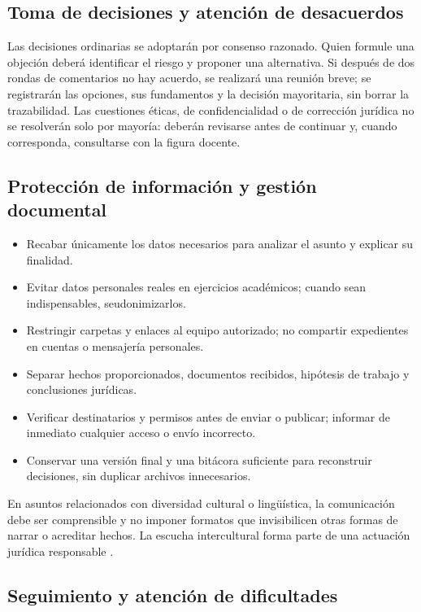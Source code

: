 \documentclass[
  spanish,
  letterpaper, oneside
]{article}
\begin{document}
\subsection{Toma de decisiones y atención de desacuerdos}

Las decisiones ordinarias se adoptarán por consenso razonado. Quien formule una
objeción deberá identificar el riesgo y proponer una alternativa. Si después de dos
rondas de comentarios no hay acuerdo, se realizará una reunión breve; se registrarán
las opciones, sus fundamentos y la decisión mayoritaria, sin borrar la trazabilidad.
Las cuestiones éticas, de confidencialidad o de corrección jurídica no se resolverán
solo por mayoría: deberán revisarse antes de continuar y, cuando corresponda,
consultarse con la figura docente.

\subsection{Protección de información y gestión documental}

\begin{itemize}
  \item Recabar únicamente los datos necesarios para analizar el asunto y explicar su finalidad.
  \item Evitar datos personales reales en ejercicios académicos; cuando sean indispensables, seudonimizarlos.
  \item Restringir carpetas y enlaces al equipo autorizado; no compartir expedientes en cuentas o mensajería personales.
  \item Separar hechos proporcionados, documentos recibidos, hipótesis de trabajo y conclusiones jurídicas.
  \item Verificar destinatarios y permisos antes de enviar o publicar; informar de inmediato cualquier acceso o envío incorrecto.
  \item Conservar una versión final y una bitácora suficiente para reconstruir decisiones, sin duplicar archivos innecesarios.
\end{itemize}

En asuntos relacionados con diversidad cultural o lingüística, la comunicación debe
ser comprensible y no imponer formatos que invisibilicen otras formas de narrar o
acreditar hechos. La escucha intercultural forma parte de una actuación jurídica
responsable \citep{pech2016manual,scjn2022protocolo}.

\subsection{Seguimiento y atención de dificultades}
\end{document}
